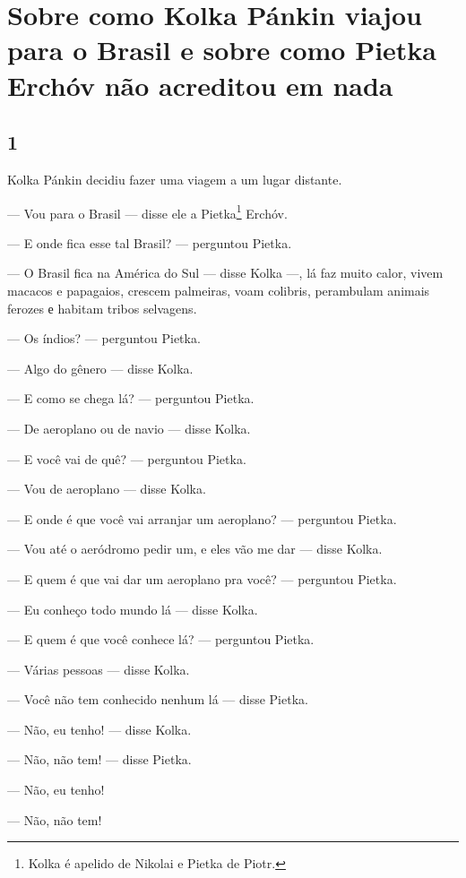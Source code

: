 \chapter{Sobre como Kolka Pánkin viajou para o Brasil e sobre como Pietka Erchóv não acreditou em nada} \label{part15}

\section{1}

\noindent{}Kolka Pánkin decidiu fazer uma viagem a um lugar distante.

--- Vou para o Brasil --- disse ele a Pietka\footnote{Kolka é apelido de Nikolai e Pietka de Piotr.} Erchóv.

--- E onde fica esse tal Brasil? --- perguntou Pietka.

--- O Brasil fica na América do Sul --- disse Kolka ---, lá faz muito
calor, vivem macacos e papagaios, crescem palmeiras, voam colibris,
perambulam animais ferozes е habitam tribos selvagens.

--- Os índios? --- perguntou Pietka.

--- Algo do gênero --- disse Kolka.

--- E como se chega lá? --- perguntou Pietka.

--- De aeroplano ou de navio --- disse Kolka.

--- E você vai de quê? --- perguntou Pietka.

--- Vou de aeroplano --- disse Kolka.

--- E onde é que você vai arranjar um aeroplano? --- perguntou Pietka.

--- Vou até o aeródromo pedir um, e eles vão me dar --- disse Kolka.

--- E quem é que vai dar um aeroplano pra você? --- perguntou Pietka.

--- Eu conheço todo mundo lá --- disse Kolka.

--- E quem é que você conhece lá? --- perguntou Pietka.

--- Várias pessoas --- disse Kolka.

--- Você não tem conhecido nenhum lá --- disse Pietka.

--- Não, eu tenho! --- disse Kolka.

--- Não, não tem! --- disse Pietka.

--- Não, eu tenho!

--- Não, não tem!

